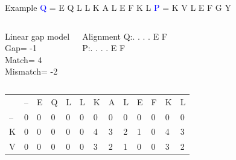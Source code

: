\documentclass{bredelebeamer}
\begin{document}
 \begin{frame}{Example}
 \centering
 \textcolor{blue}{Q} = E Q L L K A L E F K L \quad \textcolor{blue}{P} = K V L E F G Y
\begin{columns}
\begin{block}{Linear gap model} \\
Gap= -1 \\
Match= 4 \\
Mismatch= -2
\end{block}
\begin{block}{Alignment}
Q:\quad . . . . E F \\
P:\quad . . . . E F
\end{block}
\end{columns}

\begin{table}[]
\centering
\begin{tabular}{*{13}{p{0.4cm}}}
                        & --                     & E                      & Q                      & L                      & L                      & K                      & A                      & L                      &\cellcolor[HTML]{FFFF00}E                       & F                                               & K                       & L                       \\ \cline{2-13} 
\multicolumn{1}{l|}{--} & \multicolumn{1}{l|}{0} & \multicolumn{1}{l|}{0} & \multicolumn{1}{l|}{0} & \multicolumn{1}{l|}{0} & \multicolumn{1}{l|}{0} & \multicolumn{1}{l|}{0} & \multicolumn{1}{l|}{0} & \multicolumn{1}{l|}{0} & \multicolumn{1}{l|}{0}  & \multicolumn{1}{l|}{0}                          & \multicolumn{1}{l|}{0}  & \multicolumn{1}{l|}{0}  \\ \cline{2-13} 
\multicolumn{1}{l|}{K}  & \multicolumn{1}{l|}{0} & \multicolumn{1}{l|}{0} & \multicolumn{1}{l|}{0} & \multicolumn{1}{l|}{0} & \multicolumn{1}{l|}{0} & \multicolumn{1}{l|}{4} & \multicolumn{1}{l|}{3} & \multicolumn{1}{l|}{2} & \multicolumn{1}{l|}{1}  & \multicolumn{1}{l|}{0}                          & \multicolumn{1}{l|}{4}  & \multicolumn{1}{l|}{3}  \\ \cline{2-13}  %
\multicolumn{1}{l|}{V}  & \multicolumn{1}{l|}{0} & \multicolumn{1}{l|}{0} & \multicolumn{1}{l|}{0} & \multicolumn{1}{l|}{0} & \multicolumn{1}{l|}{0} & \multicolumn{1}{l|}{3} & \multicolumn{1}{l|}{2} & \multicolumn{1}{l|}{1} & \multicolumn{1}{l|}{0}  & \multicolumn{1}{l|}{0}                          & \multicolumn{1}{l|}{3}  & \multicolumn{1}{l|}{2}  \\ \cline{2-13} 

\end{tabular}
\end{table}
\end{frame}
\end{document}
